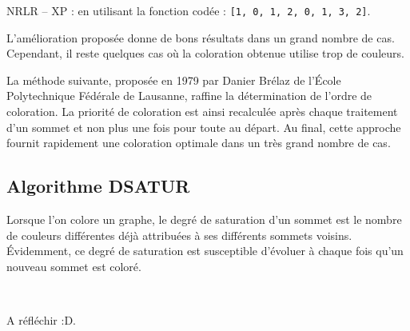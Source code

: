 \ifprof
\begin{corrige}
NRLR -- XP : en utilisant la fonction codée : \lstinline{[1, 0, 1, 2, 0, 1, 3, 2]}.
\end{corrige}
\else
\fi

L'amélioration proposée donne de bons résultats dans un grand nombre de cas. Cependant, il reste quelques cas où la coloration obtenue utilise trop de couleurs.

La méthode suivante, proposée en 1979 par Danier Brélaz de l'École Polytechnique Fédérale de Lausanne, raffine la détermination de l'ordre de coloration. La priorité de coloration est ainsi recalculée après chaque traitement d'un sommet et non plus une fois pour toute au départ. Au final, cette approche fournit rapidement une coloration optimale dans un très grand nombre de cas.


\subsection{Algorithme DSATUR}
Lorsque l’on colore un graphe, le degré de saturation d’un sommet est le nombre de couleurs différentes déjà attribuées à ses différents sommets voisins. Évidemment, ce degré de saturation est susceptible d’évoluer à chaque fois qu’un nouveau sommet est coloré.

\ifprof
\begin{corrige}~\\ \vspace{-.5cm}

\end{corrige}
\else
\fi



\ifprof
\begin{corrige}
A réfléchir :D.
\end{corrige}
\else
\fi


